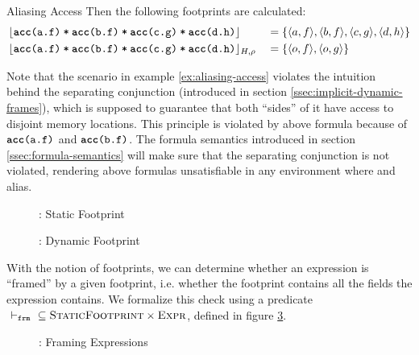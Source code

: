 \begin{description}
\begin{example}{Aliasing Access}
        Then the following footprints are calculated:
        \begin{alignat*}{2}
        & \staticFP
        {\phiCons{\phiCons{\phiAcc{a}{f}}{\phiAcc{b}{f}}}{\phiCons{\phiAcc{c}{g}}{\phiAcc{d}{h}}}} 
        &&= \{ \langle a, f \rangle, \langle b, f \rangle, \langle c, g \rangle, \langle d, h \rangle \}\\
        & \dynamicFP{H}{\rho}
        {\phiCons{\phiCons{\phiAcc{a}{f}}{\phiAcc{b}{f}}}{\phiCons{\phiAcc{c}{g}}{\phiAcc{d}{h}}}} 
        &&= \{ \langle o, f \rangle, \langle o, g \rangle \}
        \end{alignat*}
    \end{example}
    
    Note that the scenario in example \ref{ex:aliasing-access} violates the intuition behind the separating conjunction (introduced in section \ref{ssec:implicit-dynamic-frames}), which is supposed to guarantee that both “sides” of it have access to disjoint memory locations.
    This principle is violated by above formula because of $\phiAcc{a}{f}$ and $\phiAcc{b}{f}$.
    The formula semantics introduced in section \ref{ssec:formula-semantics} will make sure that the separating conjunction is not violated, rendering above formulas unsatisfiable in any environment where  and  alias.
\end{description}
\begin{figure}[h]
    
    \caption{\svlidf: Static Footprint}
    \label{fig:sfp}
\end{figure}
\begin{figure}[h]
    
    \caption{\svlidf: Dynamic Footprint}
    \label{fig:dfp}
\end{figure}

With the notion of footprints, we can determine whether an expression is “framed” by a given footprint, i.e. whether the footprint contains all the fields the expression contains.
We formalize this check using a predicate $\sfrme \subseteq \setSFootprint \times \setExpr$, defined in figure \ref{fig:svl-frme}.
\begin{figure}
    
    \caption{\svlidf: Framing Expressions}
    \label{fig:svl-frme}
\end{figure}

